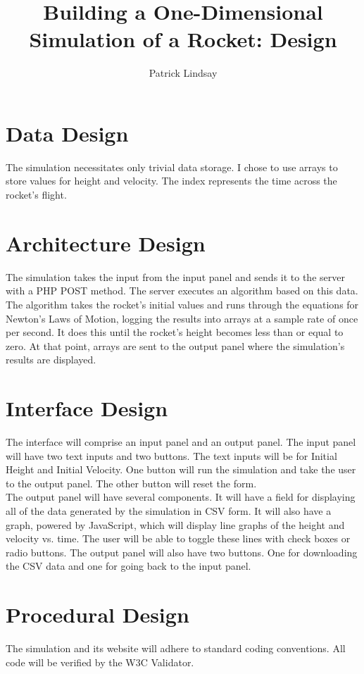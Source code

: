 \documentclass{report}
\author{Patrick Lindsay}
\title{Building a One-Dimensional Simulation of a Rocket: Design}
\begin{document}
\maketitle
\tableofcontents

\section{Data Design}
	The simulation necessitates only trivial data storage.  I chose to use arrays to store values for height and velocity. The index represents the time across the rocket's flight.
\section{Architecture Design}
	The simulation takes the input from the input panel and sends it to the server with a PHP POST method. The server executes an algorithm based on this data.  The algorithm takes the rocket's initial values and runs through the equations for Newton's Laws of Motion, logging the results into arrays at a sample rate of once per second.  It does this until the rocket's height becomes less than or equal to zero.  At that point, arrays are sent to the output panel where the simulation's results are displayed.
\section{Interface Design}
	The interface will comprise an input panel and an output panel. The input panel will have two text inputs and two buttons. The text inputs will be for Initial Height and Initial Velocity.  One button will run the simulation and take the user to the output panel.  The other button will reset the form. \\
	The output panel will have several components.  It will have a field for displaying all of the data generated by the simulation in CSV form.  It will also have a graph, powered by JavaScript, which will display line graphs of the height and velocity vs. time.  The user will be able to toggle these lines with check boxes or radio buttons.  The output panel will also have two buttons.  One for downloading the CSV data and one for going back to the input panel.
\section{Procedural Design}
	The simulation and its website will adhere to standard coding conventions.  All code will be verified by the W3C Validator. 
\end{document}
